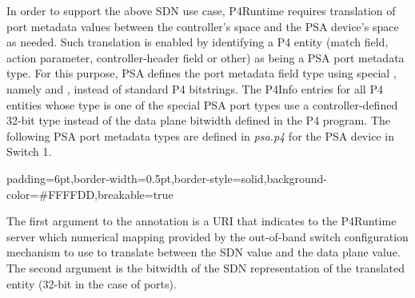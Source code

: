 \documentclass[11pt]{article}
\begin{document}
{%
\noindent{}In order to support the above SDN use case, P4Runtime requires translation of
port metadata values between the controller's space and the PSA device's space
as needed. Such translation is enabled by identifying a P4 entity (match field,
action parameter, controller-header field or other) as being a PSA port metadata
type. For this purpose, PSA defines the port metadata field type using special
, namely  and
, instead of standard P4 bitstrings. The P4Info entries for
all P4 entities whose type is one of the special PSA port types use a
controller-defined 32-bit type instead of the data plane bitwidth defined in the
P4 program. The following PSA port metadata types are defined in \emph{psa.p4} for
the PSA device in Switch 1.%

\begin{mdbmargintb}{6pt}{6pt}%
\begin{mdblock}{padding=6pt,border-width=0.5pt,border-style=solid,background-color=\#FFFFDD,breakable=true}%
\begin{mdpre}%
\end{mdpre}%
\end{mdblock}%
\end{mdbmargintb}%

\noindent{}The first argument to the  annotation is a URI that
indicates to the P4Runtime server which numerical mapping \textemdash{} provided by the
out-of-band switch configuration mechanism \textemdash{} to use to translate between the
SDN value and the data plane value. The second argument is the bitwidth of the
SDN representation of the translated entity (32-bit in the case of ports).%

}
\end{document}
